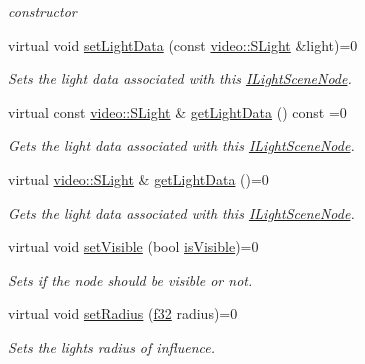 \begin{DoxyCompactItemize}
\begin{DoxyCompactList}\small\item\em constructor \end{DoxyCompactList}\item 
virtual void \hyperlink{classirr_1_1scene_1_1ILightSceneNode_acf74ff3400a26ae31eb96b9c479e62d5}{set\+Light\+Data} (const \hyperlink{structirr_1_1video_1_1SLight}{video\+::\+S\+Light} \&light)=0
\begin{DoxyCompactList}\small\item\em Sets the light data associated with this \hyperlink{classirr_1_1scene_1_1ILightSceneNode}{I\+Light\+Scene\+Node}. \end{DoxyCompactList}\item 
virtual const \hyperlink{structirr_1_1video_1_1SLight}{video\+::\+S\+Light} \& \hyperlink{classirr_1_1scene_1_1ILightSceneNode_aff8c7b0a10b1fee1264ae68b772c809e}{get\+Light\+Data} () const  =0
\begin{DoxyCompactList}\small\item\em Gets the light data associated with this \hyperlink{classirr_1_1scene_1_1ILightSceneNode}{I\+Light\+Scene\+Node}. \end{DoxyCompactList}\item 
virtual \hyperlink{structirr_1_1video_1_1SLight}{video\+::\+S\+Light} \& \hyperlink{classirr_1_1scene_1_1ILightSceneNode_a20147e049be1a4790346fd72b150b30c}{get\+Light\+Data} ()=0
\begin{DoxyCompactList}\small\item\em Gets the light data associated with this \hyperlink{classirr_1_1scene_1_1ILightSceneNode}{I\+Light\+Scene\+Node}. \end{DoxyCompactList}\item 
virtual void \hyperlink{classirr_1_1scene_1_1ILightSceneNode_a3a6a6681a665ec4c214cda8a84a29337}{set\+Visible} (bool \hyperlink{classirr_1_1scene_1_1ISceneNode_a1aef4f0feccebcd0d38373beadbc1827}{is\+Visible})=0
\begin{DoxyCompactList}\small\item\em Sets if the node should be visible or not. \end{DoxyCompactList}\item 
virtual void \hyperlink{classirr_1_1scene_1_1ILightSceneNode_a7da64c8c4776988a39927827f2c3f364}{set\+Radius} (\hyperlink{namespaceirr_a0277be98d67dc26ff93b1a6a1d086b07}{f32} radius)=0
\begin{DoxyCompactList}\small\item\em Sets the light\textquotesingle{}s radius of influence. \end{DoxyCompactList}\item 

\end{DoxyCompactItemize}
